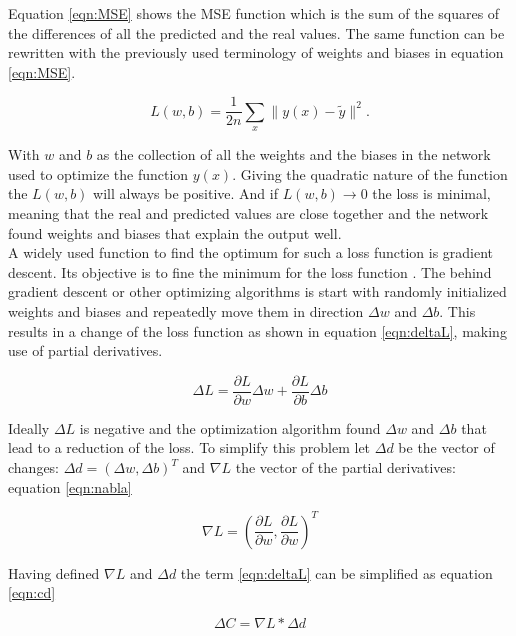 Equation \ref{eqn:MSE} shows the MSE function which is the sum of the squares of the differences of all the
predicted and the real values. The same function can be rewritten with the previously used terminology of
weights and biases in equation \ref{eqn:MSE}.

\begin{equation}
  L(w,b) =  \frac{1}{2n} \sum_x \| y(x) - \widetilde{y}\|^2.
 \label{eqn:MSE2}
\end{equation}

With $w$ and $b$ as the collection of all the weights and the biases in the network used to optimize the
function $y(x)$. Giving the quadratic nature of the function the $L(w,b)$ will always be positive. And if
$L(w,b) \rightarrow 0$ the loss is minimal, meaning that the real and predicted values are close together and
the network found weights and biases that explain the output well. \\
A widely used function to find the optimum for such a loss function is gradient descent. Its objective is to
fine the minimum for the loss function \cite{bottou1991stochastic}.  The behind gradient descent or other
optimizing algorithms is start with randomly initialized weights and biases and repeatedly move them in
direction $\Delta w$ and $\Delta b$. This results in a change of the loss function as shown in equation
\ref{eqn:deltaL}, making use of partial derivatives.

\begin{equation}
 \Delta L = \frac{\partial L}{\partial w} \Delta w + \frac{\partial L}{\partial b} \Delta b
\label{eqn:deltaL}  
\end{equation}

Ideally $\Delta L$ is negative and the optimization algorithm found $\Delta w$ and $\Delta b$ that lead to a
reduction of the loss. To simplify this problem let $\Delta d$ be the vector of changes:
$\Delta d = (\Delta w , \Delta b)^T $ and $\nabla L$ the vector of the partial derivatives: equation
\ref{eqn:nabla}

\begin{equation}
 \nabla L = \left(\frac{\partial L}{\partial w}, \frac{\partial L}{\partial w}\right)^T
\label{eqn:nabla}
\end{equation}

Having defined $\nabla L$ and $\Delta d$ the term \ref{eqn:deltaL} can be simplified as equation \ref{eqn:cd}

\begin{equation}
\Delta C = \nabla L * \Delta d
 \label{eqn:cd}
\end{equation}

